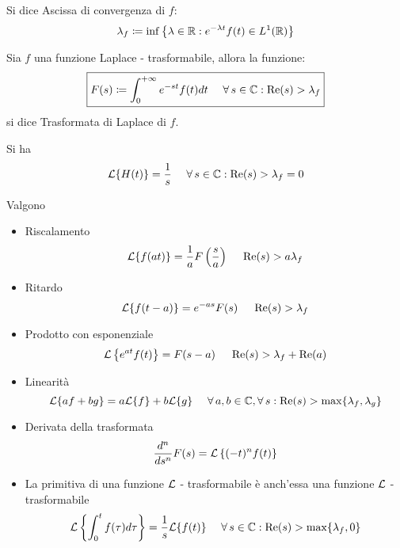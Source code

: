 \begin{defn}
Si dice Ascissa di convergenza di $\displaystyle f$:
\begin{equation*}
\lambda _{f} \coloneqq \inf\left\{\lambda \in \mathbb{R}  :e^{ - \lambda t} f(t) \in L^{1}(\mathbb{R})\right\}
\end{equation*}
\end{defn}
\begin{defn}
Sia $\displaystyle f$ una funzione Laplace - trasformabile, allora la funzione:
\begin{equation*}
\boxed{F(s) \coloneqq \int ^{ + \infty }_{0} e^{ - st} f(t) dt\ \ \ \ \forall s\in \CC  :\Re (s)  > \lambda _{f}}
\end{equation*}
si dice Trasformata di Laplace di $\displaystyle f$.
\end{defn}
\begin{rem}
 Si ha
\begin{equation*}
\Lc\{H(t)\} = \frac{1}{s} \ \ \ \ \forall s\in \CC  :\Re (s)  > \lambda _{f} = 0
\end{equation*}
\end{rem}
\begin{thm}
[Proprietà] Valgono
\begin{itemize}
\item Riscalamento
\begin{equation*}
\mathcal{L}\{f(at)\} = \frac{1}{a} F\left(\frac{s}{a}\right) \ \ \ \ \operatorname{Re} (s)  > a\lambda _{f}
\end{equation*}
\item Ritardo
\begin{equation*}
\mathcal{L}\{f(t - a)\} = e^{ - as} F(s) \ \ \ \ \operatorname{Re} (s)  > \lambda _{f}
\end{equation*}
\item Prodotto con esponenziale
\begin{equation*}
\Lc\left\{e^{at} f(t)\right\} = F(s - a) \ \ \ \ \Re (s)  > \lambda _{f} + \Re (a)
\end{equation*}
\item Linearità
\begin{equation*}
\Lc\{af + bg\} = a\Lc\{f\} + b\Lc\{g\} \ \ \ \ \forall a,b\in \CC  ,\forall s:\Re (s)  > \max\{\lambda _{f} ,\lambda _{g}\}
\end{equation*}
\item Derivata della trasformata
\begin{equation*}
\frac{d^{n}}{ds^{n}} F(s) = \mathcal{L}\left\{(- t)^{n} f(t)\right\}
\end{equation*}
\item La primitiva di una funzione $\mathcal{L}$ - trasformabile è anch'essa una funzione $\mathcal{L}$ - trasformabile
\begin{equation*}
\Lc\left\{\int ^{t}_{0} f(\tau) d\tau \right\} = \frac{1}{s}\Lc\{f(t)\} \ \ \ \ \forall s\in \CC  :\Re (s)  > \max\{\lambda _{f} ,0\}
\end{equation*}
\end{itemize}
\end{thm}
